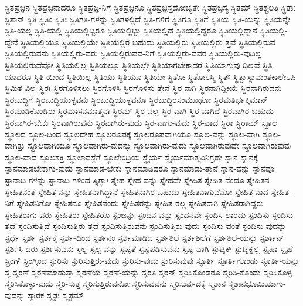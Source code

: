 {ಸ್ಥಿತಪ್ರಜ್ಞನ
ಸ್ಥಿತಪ್ರಜ್ಞನಾದರೂ
ಸ್ಥಿತಪ್ರಜ್ಞ-ನಿಗೆ
ಸ್ಥಿತಪ್ರಜ್ಞನೂ
ಸ್ಥಿತಪ್ರಜ್ಞಸ್ತದೋಚ್ಯತೇ
ಸ್ಥಿತಪ್ರಜ್ಞಸ್ಯ
ಸ್ಥಿತಮ್
ಸ್ಥಿತಶ್ಚಲತಿ
ಸ್ಥಿತಾಃ
ಸ್ಥಿತಾನ್
ಸ್ಥಿತಿ
ಸ್ಥಿತಿಂ
ಸ್ಥಿತಿಃ
ಸ್ಥಿತಿಗತಿ-ಗಳನ್ನು
ಸ್ಥಿತಿಗಳಲ್ಲಿದೆ
ಸ್ಥಿತಿ-ಗಳಿಗೆ
ಸ್ಥಿತಿಗೂ
ಸ್ಥಿತಿಗೆ
ಸ್ಥಿತಿಯ
ಸ್ಥಿತಿ-ಯನ್ನು
ಸ್ಥಿತಿಯನ್ನೇ
ಸ್ಥಿತಿ-ಯಲ್ಲ
ಸ್ಥಿತಿ-ಯಲ್ಲಿ
ಸ್ಥಿತಿಯಲ್ಲಿಟ್ಟರೂ
ಸ್ಥಿತಿಯಲ್ಲಿಟ್ಟು
ಸ್ಥಿತಿಯಲ್ಲಿದೆ
ಸ್ಥಿತಿಯಲ್ಲಿದ್ದರೂ
ಸ್ಥಿತಿಯಲ್ಲಿದ್ದಾನೆ
ಸ್ಥಿತಿಯಲ್ಲಿ-ದ್ದೇನೆ
ಸ್ಥಿತಿಯಲ್ಲಿಯೂ
ಸ್ಥಿತಿಯಲ್ಲಿಯೇ
ಸ್ಥಿತಿಯಲ್ಲಿರ-ಬಹುದು
ಸ್ಥಿತಿಯಲ್ಲಿರು
ಸ್ಥಿತಿಯಲ್ಲಿರು-ತ್ತವೆ
ಸ್ಥಿತಿಯಲ್ಲಿರುವ
ಸ್ಥಿತಿಯಲ್ಲಿರುವನು
ಸ್ಥಿತಿಯಲ್ಲಿರು-ವರು
ಸ್ಥಿತಿಯಲ್ಲಿರುವವ-ನಿಗೆ
ಸ್ಥಿತಿಯಲ್ಲಿರು-ವವರ
ಸ್ಥಿತಿಯಲ್ಲಿರು-ವುದಿಲ್ಲ
ಸ್ಥಿತಿಯಲ್ಲಿರುವೆವೋ
ಸ್ಥಿತಿಯಲ್ಲಿಲ್ಲ
ಸ್ಥಿತಿಯಲ್ಲೂ
ಸ್ಥಿತಿಯಲ್ಲೇ
ಸ್ಥಿತಿಯಾಗಬೇಕಾದರೆ
ಸ್ಥಿತಿಯಾಗುವು-ದಿಲ್ಲವೆ
ಸ್ಥಿತಿ-ಯಾದರೂ
ಸ್ಥಿತಿ-ಯಿಂದ
ಸ್ಥಿತಿಯಿಲ್ಲ
ಸ್ಥಿತಿಯು
ಸ್ಥಿತಿಯೂ
ಸ್ಥಿತಿಯೇ
ಸ್ಥಿತೋ
ಸ್ಥಿತೋಽಸ್ಮಿ
ಸ್ಥಿತೌ
ಸ್ಥಿತ್ವಾಸ್ಯಾಮಂತಕಾಲೇಽಪಿ
ಸ್ಥಿಮಿತ-ವಿಲ್ಲ
ಸ್ಥಿರಃ
ಸ್ಥಿರಗೊಳಿಸಲು
ಸ್ಥಿರಗೊಳಿಸಿ
ಸ್ಥಿರಗೊಳಿಸು-ತ್ತೇನೆ
ಸ್ಥಿರ-ನಾಗಿ
ಸ್ಥಿರನಾಗಿದ್ದೀಯೆ
ಸ್ಥಿರನಾಗಿರುವನು
ಸ್ಥಿರಬುದ್ಧಿಗೆ
ಸ್ಥಿರಬುದ್ಧಿಯುಳ್ಳವನು
ಸ್ಥಿರಬುದ್ಧಿಯುಳ್ಳವನೂ
ಸ್ಥಿರಬುದ್ಧಿರಸಂಮೂಢೋ
ಸ್ಥಿರಮತಿರ್ಭಕ್ತಿಮಾನ್
ಸ್ಥಿರಮಾಡಿಕೊಂಡಿರು
ಸ್ಥಿರಮಾಸನಮಾತ್ಮನಃ
ಸ್ಥಿರಮ್
ಸ್ಥಿರ-ವಲ್ಲ
ಸ್ಥಿರ-ವಾಗಿ
ಸ್ಥಿರ-ವಾಗಿದೆ
ಸ್ಥಿರವಾಗಿರ-ಬಹುದು
ಸ್ಥಿರವಾಗಿರ-ಬೇಕು
ಸ್ಥಿರವಾಗಿರುವನು
ಸ್ಥಿರವಾಗಿರು-ವುದು
ಸ್ಥಿರ-ವಾಗು-ವುದು
ಸ್ಥಿರ-ವಾದ
ಸ್ಥಿರಾ
ಸ್ಥಿರಾಮ್
ಸ್ಥೂಲ
ಸ್ಥೂಲದ
ಸ್ಥೂಲ-ದಿಂದ
ಸ್ಥೂಲದೇಹ
ಸ್ಥೂಲರೂಪಕ್ಕೆ
ಸ್ಥೂಲರೂಪವಾಗಿಯೂ
ಸ್ಥೂಲ-ವನ್ನು
ಸ್ಥೂಲ-ವಾಗಿ
ಸ್ಥೂಲ-ವಾಗಿತ್ತು
ಸ್ಥೂಲವಾಗಿಯೂ
ಸ್ಥೂಲವಾಗಿರು-ವುದನ್ನು
ಸ್ಥೂಲವಾಗಿರು-ವುದು
ಸ್ಥೂಲವಾಗಿರುವುದೇ
ಸ್ಥೂಲವಾಗಿರುವುವು
ಸ್ಥೂಲ-ವಾದ
ಸ್ಥೂಲಶಕ್ತಿ
ಸ್ಥೂಲಾವಸ್ಥೆಗೆ
ಸ್ಥೂಲೇಂದ್ರಿಯ
ಸ್ಥೈರ್ಯ
ಸ್ಥೈರ್ಯಮಾತ್ಮವಿನಿಗ್ರಹಃ
ಸ್ನಾನ
ಸ್ನಾನಕ್ಕೆ
ಸ್ನಾನಮಾಡಬೇಕಾಗು-ವುದು
ಸ್ನಾನಮಾಡ-ಬೇಕು
ಸ್ನಾನಮಾಡಿದರೂ
ಸ್ನಾನಮಾಡು-ತ್ತಾನೆ
ಸ್ನಾನ-ವನ್ನು
ಸ್ನಾನವೂ
ಸ್ನಾನಾದಿ-ಗಳನ್ನು
ಸ್ನಾನಾದಿ-ಗಳಿಂದ
ಸ್ನಿಗ್ಧಾಃ
ಸ್ನೇಹ
ಸ್ನೇಹ-ವನ್ನು
ಸ್ನೇಹವೇ
ಸ್ನೇಹಿತ
ಸ್ನೇಹಿತ-ನೆಂದೂ
ಸ್ನೇಹಿತನ
ಸ್ನೇಹಿತನಂತೆ
ಸ್ನೇಹಿತ-ನನ್ನು
ಸ್ನೇಹಿತನಾಗಿದ್ದಾನೆ
ಸ್ನೇಹಿತನಾಗಿರ-ಬಹುದು
ಸ್ನೇಹಿತನಾಗುವೆನೋ
ಸ್ನೇಹಿತ-ನಾದ
ಸ್ನೇಹಿತ-ನಿಗೆ
ಸ್ನೇಹಿತನಿಗೋ
ಸ್ನೇಹಿತನೂ
ಸ್ನೇಹಿತನೆಂದು
ಸ್ನೇಹಿತರನ್ನು
ಸ್ನೇಹಿತ-ರಲ್ಲ
ಸ್ನೇಹಿತರಾಗಿ
ಸ್ನೇಹಿತರಾಗಿದ್ದರು
ಸ್ನೇಹಿತರಾಗು-ವರು
ಸ್ನೇಹಿತರು
ಸ್ನೇಹಿತರೊ
ಸ್ಪಂಜನ್ನು
ಸ್ಪಂದನ-ವನ್ನು
ಸ್ಪಂದನವೇ
ಸ್ಪಂದಿಸ-ಲಾರದು
ಸ್ಪಂದಿಸು
ಸ್ಪಂದಿಸು-ತ್ತದೆ
ಸ್ಪಂದಿಸುತ್ತಿದೆ
ಸ್ಪಂದಿಸುತ್ತಿರು-ತ್ತದೆ
ಸ್ಪಂದಿಸುತ್ತಿರುವನು
ಸ್ಪಂದಿಸುತ್ತಿರು-ವುದು
ಸ್ಪಂದಿಸು-ವಂತೆ
ಸ್ಪಂದಿಸು-ವುದನ್ನು
ಸ್ಪರ್ಧೆ
ಸ್ಪರ್ಶ
ಸ್ಪರ್ಶಕ್ಕೆ
ಸ್ಪರ್ಶ-ದಿಂದ
ಸ್ಪರ್ಶನಂ
ಸ್ಪರ್ಶಮಾಡಿದ
ಸ್ಪರ್ಶಶಿಲೆ
ಸ್ಪರ್ಶಶಿಲೆಗೆ
ಸ್ಪರ್ಶಶಿಲೆ-ಯನ್ನು
ಸ್ಪರ್ಶಾನ್
ಸ್ಪರ್ಶಿಸಿ-ದರು
ಸ್ಪರ್ಶಿಸುವನು
ಸ್ಪಲ್ಪ
ಸ್ಪಲ್ಪ-ವನ್ನು
ಸ್ಪಷ್ಟತೆ
ಸ್ಪಷ್ಟಪಡಿಸುವನು
ಸ್ಪಷ್ಟ-ವಾಗಿ
ಸ್ಪುಟ್ನಿಕ್
ಸ್ಪುಟ್ನಿಕ್ನಲ್ಲಿ
ಸ್ಪೃಹಾ
ಸ್ಪೃಹೆ
ಸ್ಪ್ರಿಂಗ್
ಸ್ಪ್ರಿಂಗ್ನಿಂದ
ಸ್ಫುರಿಸು
ಸ್ಫುರಿಸುತ್ತಿರು-ವುದು
ಸ್ಫುರಿಸು-ವುದು
ಸ್ಫುರಿಸುವುವು
ಸ್ಫೂರ್ತಿ
ಸ್ಫೂರ್ತಿಗೊಂಡು
ಸ್ಫೂರ್ತಿ-ಯನ್ನು
ಸ್ಮ
ಸ್ಮರಣೆ
ಸ್ಮರಣೆಮಾಡುತ್ತಾ
ಸ್ಮರಣೆಯ
ಸ್ಮರಣೆ-ಯನ್ನು
ಸ್ಮರತಿ
ಸ್ಮರನ್
ಸ್ಮರಿಸಿಕೊಂಡರೂ
ಸ್ಮರಿಸಿ-ಕೊಂಡು
ಸ್ಮರಿಸಿಕೊಳ್ಳ
ಸ್ಮರಿಸಿಕೊಳ್ಳು-ವುದು
ಸ್ಮರಿ-ಸುತ್ತ
ಸ್ಮರಿಸುತ್ತಿರುವನೋ
ಸ್ಮರಿಸುವವನು
ಸ್ಮರಿಸುವು-ದಕ್ಕೆ
ಸ್ಮಶಾನ
ಸ್ಮಶಾನಭೂಮಿಯಾಗು-ವುದನ್ನು
ಸ್ಮಾರಕ
ಸ್ಮೃತಃ
ಸ್ಮೃತಮ್
}
